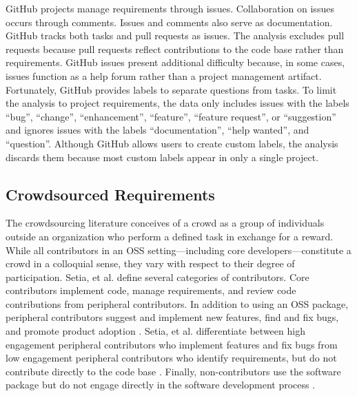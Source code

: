 GitHub projects manage requirements through issues. Collaboration on issues occurs through comments. Issues and comments also serve as documentation. GitHub tracks both tasks and pull requests as issues. The analysis excludes pull requests because pull requests reflect contributions to the code base rather than requirements. GitHub issues present additional difficulty because, in some cases, issues function as a help forum rather than a project management artifact. Fortunately, GitHub provides labels to separate questions from tasks. To limit the analysis to project requirements, the data only includes issues with the labels “bug”, “change”, “enhancement”, “feature”, “feature request”, or “suggestion” and ignores issues with the labels “documentation”, “help wanted”, and “question”. Although GitHub allows users to create custom labels, the analysis discards them because most custom labels appear in only a single project.

\subsection{Crowdsourced Requirements}

The crowdsourcing literature \cite{howe, howe2, brabham, brabham2} conceives of a crowd as a group of individuals outside an organization who perform a defined task in exchange for a reward. While all contributors in an OSS setting---including core developers---constitute a crowd in a colloquial sense, they vary with respect to their degree of participation. Setia, et al. \cite{setia} define several categories of contributors. Core contributors implement code, manage requirements, and review code contributions from peripheral contributors. In addition to using an OSS package, peripheral contributors suggest and implement new features, find and fix bugs, and promote product adoption \cite{setia}. Setia, et al. \cite{setia} differentiate between high engagement peripheral contributors who implement features and fix bugs from low engagement peripheral contributors who identify requirements, but do not contribute directly to the code base \cite{setia}. Finally, non-contributors use the software package but do not engage directly in the software development process \cite{setia}.  

